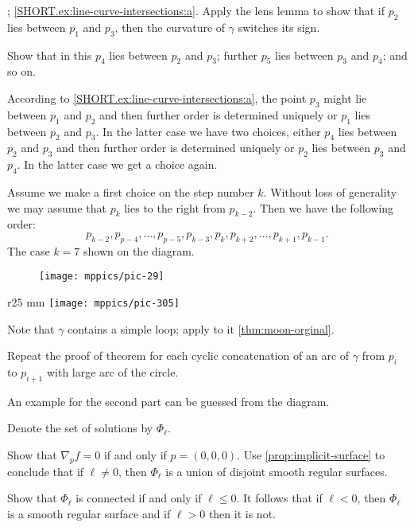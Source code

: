 \parbf{\ref{ex:line-curve-intersections}}; \ref{SHORT.ex:line-curve-intersections:a}.
Apply the lens lemma to show that if $p_2$ lies between $p_1$ and $p_3$, then the curvature of $\gamma$ switches its sign.

 Show that in this $p_4$ lies between $p_2$ and $p_3$;
further $p_5$ lies between $p_3$ and $p_4$;
and so on.

According to \ref{SHORT.ex:line-curve-intersections:a}, the point $p_3$ might lie between $p_1$ and $p_2$ and then further order is determined uniquely or $p_1$ lies between $p_2$ and $p_3$.
In the latter case we have two choices, either $p_4$ lies between $p_2$ and $p_3$ and then further order is determined uniquely or $p_2$ lies between $p_3$ and $p_4$.
In the latter case we get a choice again.

Assume we make a first choice on the step number $k$.
Without loss of generality we may assume that $p_k$ lies to the right from $p_{k-2}$.
Then we have the following order:
\[
p_{k-2},p_{p-4},\dots,p_{p-5},p_{k-3},p_k,p_{k+2},\dots,p_{k+1},p_{k-1}.
\]
The case $k=7$ shown on the diagram.

\begin{figure}[h!]
\vskip-0mm
\centering
\texttt{[image: mppics/pic-29]}
\vskip0mm
\end{figure}

\begin{wrapfigure}{r}{25 mm}
\vskip-4mm
\centering
\texttt{[image: mppics/pic-305]}
\vskip0mm
\end{wrapfigure}

 Note that $\gamma$ contains a simple loop; apply to it \ref{thm:moon-orginal}.

Repeat the proof of theorem for each cyclic concatenation of an arc of $\gamma$ from $p_i$ to $p_{i+1}$ with large arc of the circle. 

An example for the second part can be guessed from the diagram.

Denote the set of solutions by $\Phi_\ell$.

Show that $\nabla_p f=0$ if and only if $p=(0,0,0)$.
Use \ref{prop:implicit-surface} to conclude that if $\ell\ne 0$, then $\Phi_\ell$ is a union of disjoint smooth regular surfaces.

Show that $\Phi_\ell$ is connected if and only if $\ell\le 0$.
It follows that if $\ell<0$, then $\Phi_\ell$ is a smooth regular surface and if $\ell>0$ then it is not.

